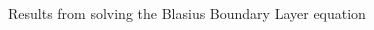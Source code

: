 \documentclass[]{aiaa-tc}%
\begin{document}
\begin{figure}[htb]%
  \caption{Results from solving the Blasius Boundary Layer equation}
  \begin{subfigmatrix}{2}

\end{subfigmatrix}
\end{figure}
\end{document}
